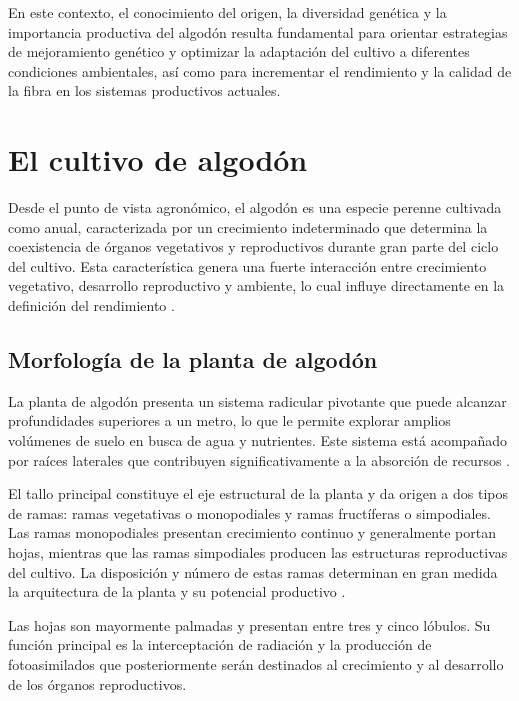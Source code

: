 \documentclass[12pt,oneside]{reedthesis}
\begin{document}
En este contexto, el conocimiento del origen, la diversidad genética y la importancia productiva del algodón resulta fundamental para orientar estrategias de mejoramiento genético y optimizar la adaptación del cultivo a diferentes condiciones ambientales, así como para incrementar el rendimiento y la calidad de la fibra en los sistemas productivos actuales.

\section{El cultivo de algodón}\label{el-cultivo-de-algoduxf3n}

Desde el punto de vista agronómico, el algodón es una especie perenne cultivada como anual, caracterizada por un crecimiento indeterminado que determina la coexistencia de órganos vegetativos y reproductivos durante gran parte del ciclo del cultivo. Esta característica genera una fuerte interacción entre crecimiento vegetativo, desarrollo reproductivo y ambiente, lo cual influye directamente en la definición del rendimiento \autocite{oosterhuis1999,taiz2015}.

\subsection{Morfología de la planta de algodón}\label{morfologuxeda-de-la-planta-de-algoduxf3n}

La planta de algodón presenta un sistema radicular pivotante que puede alcanzar profundidades superiores a un metro, lo que le permite explorar amplios volúmenes de suelo en busca de agua y nutrientes. Este sistema está acompañado por raíces laterales que contribuyen significativamente a la absorción de recursos \autocite{smith1999}.

El tallo principal constituye el eje estructural de la planta y da origen a dos tipos de ramas: ramas vegetativas o monopodiales y ramas fructíferas o simpodiales. Las ramas monopodiales presentan crecimiento continuo y generalmente portan hojas, mientras que las ramas simpodiales producen las estructuras reproductivas del cultivo. La disposición y número de estas ramas determinan en gran medida la arquitectura de la planta y su potencial productivo \autocite{oosterhuis1999}.

Las hojas son mayormente palmadas y presentan entre tres y cinco lóbulos. Su función principal es la interceptación de radiación y la producción de fotoasimilados que posteriormente serán destinados al crecimiento y al desarrollo de los órganos reproductivos.
\end{document}
